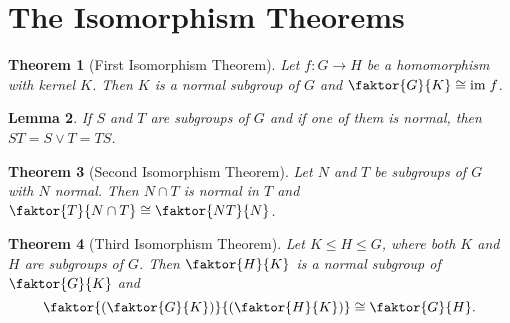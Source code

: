 \documentclass[10pt]{report}
\newtheorem{theorem}{Theorem}[chapter]
\newtheorem{lemma}[theorem]{Lemma}
\theoremstyle{definition}
\begin{document}
\section{The Isomorphism Theorems}

\begin{theorem}[First Isomorphism Theorem]
	Let $f:G\to H$ be a homomorphism with kernel $K$. Then $K$ is a normal subgroup of $G$ and $\faktor{G}{K}\cong \mathrm{im}\;f$.
\end{theorem}

\begin{lemma}
	If $S$ and $T$ are subgroups of $G$ and if one of them is normal, then $ST=S\vee T=TS$.
\end{lemma}

\begin{theorem}[Second Isomorphism Theorem]
	Let $N$ and $T$ be subgroups of $G$ with $N$ normal. Then $N\cap T$ is normal in $T$ and $\faktor{T}{N\cap T}\cong\faktor{NT}{N}$.
\end{theorem}

\begin{theorem}[Third Isomorphism Theorem]
	Let $K\leq H\leq G$, where both $K$ and $H$ are subgroups of $G$. Then $\faktor{H}{K}$ is a normal subgroup of $\faktor{G}{K}$ and
	\[ \faktor{\left(\faktor{G}{K}\right)}{\left(\faktor{H}{K}\right)}\cong\faktor{G}{H}. \]
\end{theorem}
\end{document}
